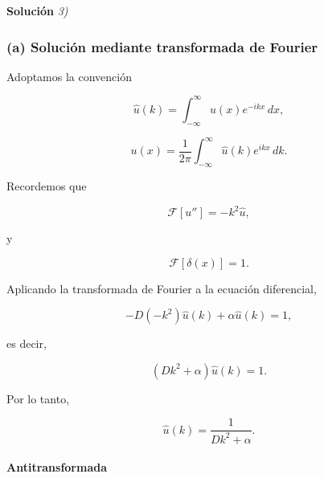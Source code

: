 \documentclass[11pt,spanish]{article}
\newcounter{problema}
\begin{document}
\vspace{0.5cm}
{\bf Soluci\'on} {\em 3)}
\vspace{0.5cm}

%
%
%
%
%

\subsubsection*{(a) Solución mediante transformada de Fourier}

Adoptamos la convención

\begin{equation}
\widehat{u}(k)
=
\int_{-\infty}^{\infty}
u(x)e^{-ikx}\,dx,
\end{equation}

\begin{equation}
u(x)
=
\frac{1}{2\pi}
\int_{-\infty}^{\infty}
\widehat{u}(k)e^{ikx}\,dk.
\end{equation}

Recordemos que

\[
\mathcal{F}[u'']
=
-k^2\widehat{u},
\]

y

\[
\mathcal{F}[\delta(x)]
=
1.
\]

Aplicando la transformada de Fourier a la ecuación diferencial,

\[
-D(-k^2)\widehat{u}(k)
+
\alpha\widehat{u}(k)
=
1,
\]

es decir,

\begin{equation}
(Dk^2+\alpha)\widehat{u}(k)=1.
\end{equation}

Por lo tanto,

\begin{equation}
\boxed{
\widehat{u}(k)
=
\frac{1}{Dk^2+\alpha}.
}
\end{equation}

\paragraph{Antitransformada}
\end{document}
